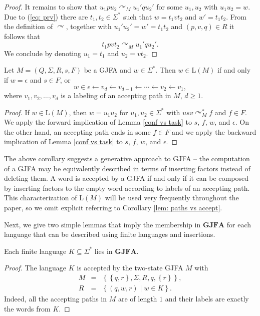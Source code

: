 \documentclass{ws-ijmpc}
\begin{document}
\begin{proof}
It remains to show that $u_{1}pu_{2}\curvearrowright_{M}u_{1}'qu_{2}'$
for some $u_{1},u_{2}$ with $u_{1}u_{2}=w$. Due to (\ref{eq: prv})
there are $t_{1},t_{2}\in\Sigma^{*}$ such that $w=t_{1}vt_{2}$ and
$w'=t_{1}t_{2}$. From the definition of $\curvearrowright$, together
with $u_{1}'u_{2}'=w'=t_{1}t_{2}$ and $\left(p,v,q\right)\in R$
it follows that 
\[
t_{1}pvt_{2}\curvearrowright_{M}u_{1}'qu_{2}'.
\]
We conclude by denoting $u_{1}=t_{1}$ and $u_{2}=vt_{2}$.
\end{proof}

\begin{corollary}
\label{lem: paths vs accept}Let $M=\left(Q,\Sigma,R,s,F\right)$
be a GJFA and $w\in\Sigma^{*}$. Then $w\in\mathrm{L}\!\left(M\right)$
if and only if $w=\epsilon$ and $s\in F$, or 
\begin{equation}
w\in\epsilon\leftarrow v_{d}\leftarrow v_{d-1}\leftarrow\cdots\leftarrow v_{2}\leftarrow v_{1},\label{eq:comp}
\end{equation}
where $v_{1},v_{2},\dots,v_{d}$ is a labeling of an accepting path
in $M$, $d\ge1$.\end{corollary}
\begin{proof}
If $w\in\mathrm{L}\!\left(M\right)$, then $w=u_{1}u_{2}$ for $u_{1},u_{2}\in\Sigma^{*}$
with $usv\curvearrowright_{M}^{*}f$ and $f\in F$. We apply the forward
implication of Lemma \ref{conf vs task} to $s$, $f$, $w$, and
$\epsilon$. On the other hand, an accepting path ends in some $f\in F$
and we apply the backward implication of Lemma \ref{conf vs task}
to $s$, $f$, $w$, and $\epsilon$.
\end{proof}
The above corollary suggests a generative approach to GJFA -- the
computation of a GJFA may be equivalently described in terms of inserting
factors instead of deleting them. A word is accepted by a GJFA if
and only if it can be composed by inserting factors to the empty word
according to labels of an accepting path. This characterization of
$\mathrm{L}\!\left(M\right)$ will be used very frequently throughout
the paper, so we omit explicit referring to Corollary \ref{lem: paths vs accept}.

Next, we give two simple lemmas that imply the membership in $\mathbf{GJFA}$
for each language that can be described using finite languages and
insertions. 
\begin{lemma}
\label{fin sub GJFA}Each finite language $K\subseteq\Sigma^{*}$
lies in $\mathbf{GJFA}$.\end{lemma}
\begin{proof}
The language $K$ is accepted by the two-state GJFA $M$ with 
\begin{eqnarray*}
M & = & \left\{ \left\{ q,r\right\} ,\Sigma,R,q,\left\{ r\right\} \right\} ,\\
R & = & \left\{ \left(q,w,r\right)\mid w\in K\right\} .
\end{eqnarray*}
Indeed, all the accepting paths in $M$ are of length $1$ and their
labels are exactly the words from $K$. 
\end{proof}
\end{document}
